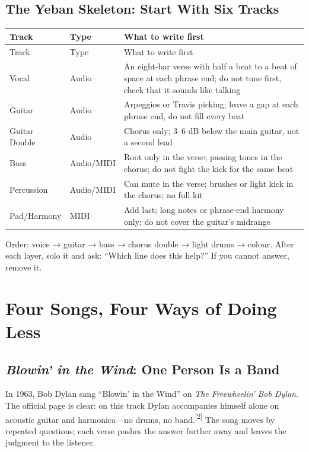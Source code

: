 \subsection{The Yeban Skeleton: Start With Six Tracks}
\label{sec:folk-yeban}

\begin{longtable}{p{}p{}p{}}
\toprule
Track & Type & What to write first \\
\midrule
\endfirsthead
\toprule
Track & Type & What to write first \\
\midrule
\endhead
Vocal & Audio & An eight-bar verse with half a beat to a beat of space at each phrase end; do not tune first, check that it sounds like talking \\
Guitar & Audio & Arpeggios or Travis picking; leave a gap at each phrase end, do not fill every beat \\
Guitar Double & Audio & Chorus only; 3--6 dB below the main guitar, not a second lead \\
Bass & Audio/MIDI & Root only in the verse; passing tones in the chorus; do not fight the kick for the same beat \\
Percussion & Audio/MIDI & Can mute in the verse; brushes or light kick in the chorus; no full kit \\
Pad/Harmony & MIDI & Add last; long notes or phrase-end harmony only; do not cover the guitar's midrange \\
\bottomrule
\end{longtable}

Order: voice → guitar → bass → chorus double → light drums → colour. After each layer, solo it and ask: ``Which line does this help?'' If you cannot answer, remove it.

\section{Four Songs, Four Ways of Doing Less}
\label{sec:folk-cases}

\subsection{\emph{Blowin' in the Wind}: One Person Is a Band}
\label{sec:folk-case-dylan}

In 1963, Bob Dylan sang ``Blowin' in the Wind'' on \emph{The Freewheelin' Bob Dylan}. The official page is clear: on this track Dylan accompanies himself alone on acoustic guitar and harmonica---no drums, no band.{\textsuperscript{[2]}} The song moves by repeated questions; each verse pushes the answer further away and leaves the judgment to the listener.

